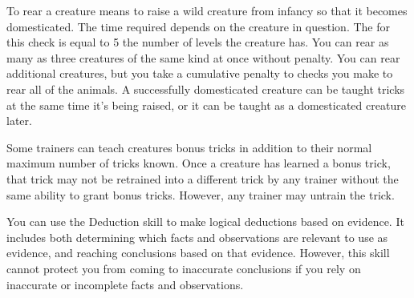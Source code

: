          To rear a creature means to raise a wild creature from infancy so that it becomes domesticated. The time required depends on the creature in question. The  for this check is equal to 5 \add the number of levels the creature has. You can rear as many as three creatures of the same kind at once without penalty. You can rear additional creatures, but you take a cumulative  penalty to checks you make to rear all of the animals. A successfully domesticated creature can be taught tricks at the same time it's being raised, or it can be taught as a domesticated creature later.

        \label{Bonus Tricks} Some trainers can teach creatures bonus tricks in addition to their normal maximum number of tricks known.
        Once a creature has learned a bonus trick, that trick may not be retrained into a different trick by any trainer without the same ability to grant bonus tricks.
        However, any trainer may untrain the trick.

\newpage
{}
    You can use the Deduction skill to make logical deductions based on evidence.
    It includes both determining which facts and observations are relevant to use as evidence, and reaching conclusions based on that evidence.
    However, this skill cannot protect you from coming to inaccurate conclusions if you rely on inaccurate or incomplete facts and observations.

